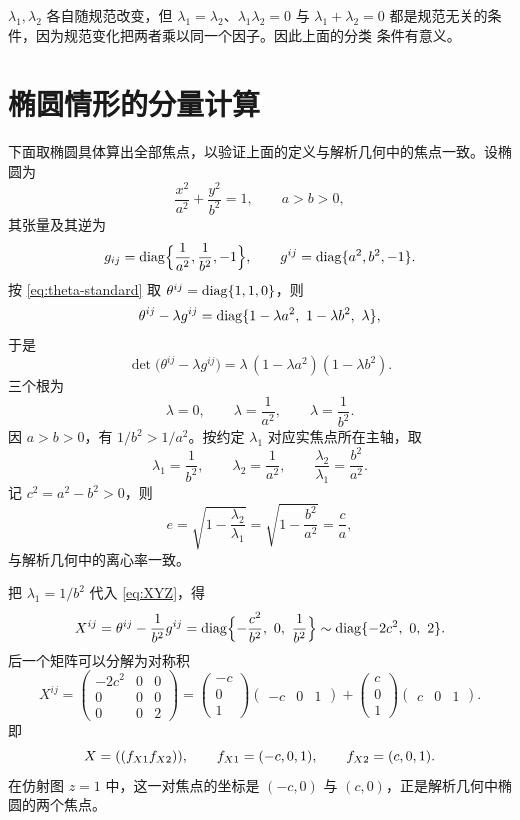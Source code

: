 \begin{remark}[特征值的规范依赖]
$\lambda_1,\lambda_2$ 各自随规范改变，但 $\lambda_1=\lambda_2$、$\lambda_1\lambda_2=0$ 与
$\lambda_1+\lambda_2=0$ 都是规范无关的条件，因为规范变化把两者乘以同一个因子。因此上面的分类
条件有意义。
\end{remark}

\section{椭圆情形的分量计算}

下面取椭圆具体算出全部焦点，以验证上面的定义与解析几何中的焦点一致。设椭圆为
\[
\frac{x^2}{a^2}+\frac{y^2}{b^2}=1,\qquad a>b>0,
\]
其张量及其逆为
\begin{equation}
g_{ij}=\operatorname{diag}\Bigl\{\frac{1}{a^2},\frac{1}{b^2},-1\Bigr\},
\qquad
g^{ij}=\operatorname{diag}\{a^2,b^2,-1\}.
\label{eq:ellipse-g}
\end{equation}
按 \eqref{eq:theta-standard} 取 $\theta^{ij}=\operatorname{diag}\{1,1,0\}$，则
\[
\theta^{ij}-\lambda g^{ij}
=\operatorname{diag}\{1-\lambda a^2,\ 1-\lambda b^2,\ \lambda\},
\]
于是
\begin{equation}
\det\bigl(\theta^{ij}-\lambda g^{ij}\bigr)
=\lambda\,(1-\lambda a^2)(1-\lambda b^2).
\label{eq:ellipse-det}
\end{equation}
三个根为
\[
\lambda=0,\qquad \lambda=\frac{1}{a^2},\qquad \lambda=\frac{1}{b^2}.
\]
因 $a>b>0$，有 $1/b^2>1/a^2$。按约定 $\lambda_1$ 对应实焦点所在主轴，取
\begin{equation}
\lambda_1=\frac{1}{b^2},\qquad \lambda_2=\frac{1}{a^2},
\qquad
\frac{\lambda_2}{\lambda_1}=\frac{b^2}{a^2}.
\label{eq:ellipse-lambda}
\end{equation}
记 $c^2=a^2-b^2>0$，则
\[
e=\sqrt{1-\frac{\lambda_2}{\lambda_1}}
=\sqrt{1-\frac{b^2}{a^2}}
=\frac{c}{a},
\]
与解析几何中的离心率一致。

把 $\lambda_1=1/b^2$ 代入 \eqref{eq:XYZ}，得
\[
X^{ij}=\theta^{ij}-\frac{1}{b^2}g^{ij}
=\operatorname{diag}\Bigl\{-\frac{c^2}{b^2},\ 0,\ \frac{1}{b^2}\Bigr\}
\sim\operatorname{diag}\{-2c^2,\ 0,\ 2\}.
\]
后一个矩阵可以分解为对称积
\begin{equation}
X^{ij}=
\begin{pmatrix}
-2c^2&0&0\\
0&0&0\\
0&0&2
\end{pmatrix}
=
\begin{pmatrix}
-c\\0\\1
\end{pmatrix}
\begin{pmatrix}
-c&0&1
\end{pmatrix}
+
\begin{pmatrix}
c\\0\\1
\end{pmatrix}
\begin{pmatrix}
c&0&1
\end{pmatrix}.
\label{eq:ellipse-X}
\end{equation}
即
\[
X=((f_{X1}f_{X2})),\qquad
f_{X1}=(-c,0,1),\qquad f_{X2}=(c,0,1).
\]
在仿射图 $z=1$ 中，这一对焦点的坐标是 $(-c,0)$ 与 $(c,0)$，正是解析几何中椭圆的两个焦点。

